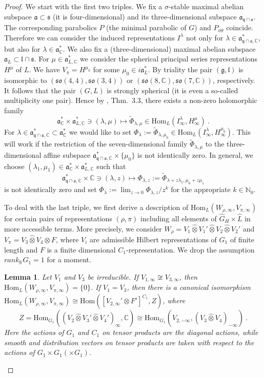 \documentclass[10]{amsart}
\newtheorem{lem}[thm]{Lemma}
\theoremstyle{remark}
\theoremstyle{definition}
\numberwithin{equation}{section}
\newcommand{\R}{\mathbb{R}}           %
\newcommand{\C}{\mathbb{C}}           %
\newcommand{\N}{\mathbb{N}}           %
\newcommand{\Hom}{\mathrm{Hom}}
\newcommand{\fa}{{\mathfrak a}}             %
\newcommand{\fg}{{\mathfrak g}}
\newcommand{\fl}{{\mathfrak l}}
\newcommand{\fo}{{\mathfrak{so}}}
\newcommand{\fq}{{\mathfrak q}}
\newcommand{\fs}{{\mathfrak s}}
\begin{document}
{\begin{proof} We start with the first two triples. We fix a $\sigma$-stable maximal abelian subspace $\fa\subset\fs$ (it is four-dimensional) and its three-dimensional subspace
$\fa_{\fq\cap\fs}$. The corresponding parabolics $P$ (the minimal parabolic of $G$) and $P_{\sigma\theta}$ coincide. Therefore we can consider the induced representations $I^\lambda$
not only for $\lambda\in \fa_{\fq\cap\fs,\C}^*$, but also for $\lambda\in \fa_{\C}^*$. We also fix a (three-dimensional) maximal abelian subspace $\fa_{L}\subset\fl\cap\fs$. For $\mu\in \fa_{L,\C}^*$ we consider the spherical principal series representations $H^\mu$ of $L$. We have $V_\pi=H^{\mu_0}$ for some $\mu_0\in i\fa_{L}^*$. By triality the pair $(\fg,\fl)$
is isomorphic to $(\fo(4,4), \fo(3,4))$ or $(\fo(8,\C),\fo(7,\C))$, respectively. It follows that the pair $(G,L)$ is strongly spherical 
(it is even a so-called multiplicity one pair).
Hence by \cite{Mol17}, Thm.~3.3, there exists a non-zero holomorphic family
$$\fa_{\C}^*\times \fa_{L,\C}^*\ni (\lambda,\mu)\mapsto \tilde \Phi_{\lambda,\mu}\in \Hom_L(I^\lambda_\infty, H^\mu_{\infty})\ .
$$
For $\lambda\in \fa_{\fq\cap\fs,\C}^*\subset \fa_{\C}^*$ we would like to set $\Phi_\lambda:=  \tilde \Phi_{\lambda,\mu_0}\in \Hom_L(I^\lambda_\infty, H^{\mu_0}_{\infty})$.
This will work if the restriction of the seven-dimensional family $\tilde \Phi_{\lambda,\mu}$ to the three-dimensional affine subspace $\fa_{\fq\cap\fs,\C}^*\times\{\mu_0\}$
is not identically zero. In general, we choose $(\lambda_1,\mu_1)\in \fa_{\C}^*\times \fa_{L,\C}^*$ such that
$$  \fa_{\fq\cap\fs,\C}^*\times \C\ni (\lambda,z)\mapsto \Phi_{\lambda,z}:= \tilde \Phi_{\lambda+z\lambda_1,\mu_0+z\mu_1} $$
is not identically zero and set $\Phi_\lambda:=\lim_{z\to 0} \Phi_{\lambda,z}/z^k$ for the appropriate $k\in\N_0$.


To deal with the last triple, we first derive a description of $\Hom_L(W_{\rho,\infty},V_{\pi,\infty})$ for certain pairs of representations $(\rho,\pi)$ including all elements of
$\widehat G_H\times\widehat L$ in more accessible terms. More precisely, we consider
$ W_\rho=V_1\hat\otimes V_1'\hat\otimes V_2\hat\otimes V_2'$ and $V_\pi=V_3\hat \otimes V_4\otimes F$, where $V_i$ are admissible Hilbert representations of $G_1$ of finite length and $F$ is a finite dimensional $C_1$-representation.  We drop the assumption  $rank_\R G_1=1$ for a moment.

\begin{lem}\label{tensor} Let $V_1$ and $V_3$ be irreducible. If $V_{1,\infty}\not\cong V_{3,\infty}$, then  $\Hom_L(W_{\rho,\infty},V_{\pi,\infty})=\{0\}$. If $V_1=V_3$, then there is
a canonical isomorphism
$  \Hom_L(W_{\rho,\infty},V_{\pi,\infty})\cong\Hom( [V_{2,\infty}'\otimes F']^{C_1}, Z)$, where
$$ Z=\Hom_{G_1}( (V_2\hat\otimes V_3'\hat\otimes V_4')_\infty,\C)\cong \Hom_{G_1}(V_{2,-\infty}, (V_3\hat \otimes V_4)_{-\infty})\ .$$
Here the actions of $G_1$ and $C_1$ on tensor products are the diagonal actions, while smooth and distribution vectors on tensor products are taken with respect to the actions of $G_1\times G_1(\times G_1)$.
\end{lem}


\end{proof}}
\end{document}
